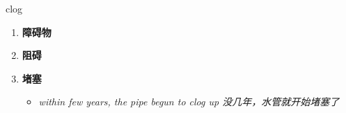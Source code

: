 
\begin{frame}
{\huge clog}
\begin{center}
\begin{enumerate}\Large
  \item \textbf{障碍物}
  \item \textbf{阻碍}
  \item \textbf{堵塞}
  \begin{itemize}
    \item \em{\Large{within few years, the pipe begun to clog up 没几年，水管就开始堵塞了}}
  \end{itemize}
\end{enumerate}
\end{center}
\end{frame}
